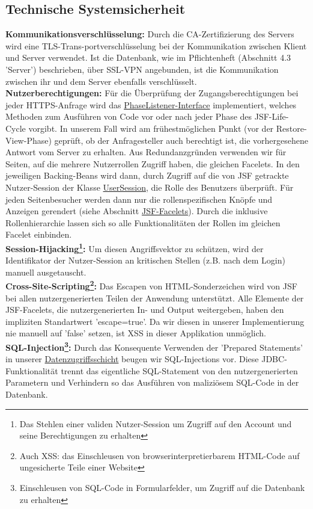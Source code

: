 \documentclass{article}
\begin{document}
\subsection{Technische Systemsicherheit}
\noindent \textbf{Kommunikationsverschlüsselung:} Durch die CA-Zertifizierung des Servers wird eine TLS-Trans-portverschlüsselung bei der Kommunikation zwischen Klient und Server verwendet. Ist die Datenbank, wie im Pflichtenheft (Abschnitt 4.3  'Server') beschrieben, über SSL-VPN angebunden, ist die Kommunikation zwischen ihr und dem Server ebenfalls verschlüsselt. \\
\textbf{Nutzerberechtigungen:} Für die Überprüfung der Zugangsberechtigungen bei jeder HTTPS-Anfrage wird das \hyperlink{PhaseListener}{PhaseListener-Interface} implementiert, welches Methoden zum Ausführen von Code vor oder nach jeder Phase des JSF-Life-Cycle vorgibt. In unserem Fall wird am frühestmöglichen Punkt (vor der Restore-View-Phase) geprüft, ob der Anfragesteller auch berechtigt ist, die vorhergesehene Antwort vom Server zu erhalten. Aus Redundanzgründen verwenden wir für Seiten, auf die mehrere Nutzerrollen Zugriff haben, die gleichen Facelets. In den jeweiligen Backing-Beans wird dann, durch Zugriff auf die von JSF getrackte Nutzer-Session der Klasse \hyperlink{Session}{UserSession}, die Rolle des Benutzers überprüft. Für jeden Seitenbesucher werden dann nur die rollenspezifischen Knöpfe und Anzeigen gerendert (siehe Abschnitt \hyperlink{Facelets}{JSF-Facelets}). Durch die inklusive Rollenhierarchie lassen sich so alle Funktionalitäten der Rollen im gleichen Facelet einbinden.\\
\textbf{Session-Hijacking\footnote{Das Stehlen einer validen Nutzer-Session um Zugriff auf den Account und seine Berechtigungen zu erhalten}:} Um diesen Angriffsvektor zu schützen, wird der Identifikator der Nutzer-Session an kritischen Stellen (z.B. nach dem Login) manuell ausgetauscht. \\
\textbf{Cross-Site-Scripting\footnote{Auch XSS: das Einschleusen von browserinterpretierbarem HTML-Code auf ungesicherte Teile einer Website}:} Das Escapen von HTML-Sonderzeichen wird von JSF bei allen nutzergenerierten Teilen der Anwendung unterstützt. Alle Elemente der JSF-Facelets, die nutzergenerierten In- und Output weitergeben, haben den impliziten Standartwert 'escape=true'. Da wir diesen in unserer Implementierung nie manuell auf 'false' setzen, ist XSS in dieser Applikation unmöglich. \\
\textbf{SQL-Injection\footnote{Einschleusen von SQL-Code in Formularfelder, um Zugriff auf die Datenbank zu erhalten}:} Durch das Konsequente Verwenden der 'Prepared Statements' in unserer \hyperlink{DAOs}{Datenzugriffsschicht} beugen wir SQL-Injections vor. Diese JDBC-Funktionalität trennt das eigentliche SQL-Statement von den nutzergenerierten Parametern und Verhindern so das Ausführen von maliziösem SQL-Code in der Datenbank. \\
\end{document}
